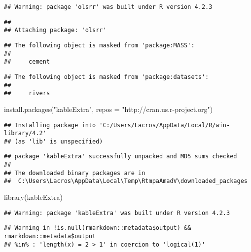 \documentclass[
]{article}
\newenvironment{Shaded}{\begin{snugshade}}{\end{snugshade}}
\newcommand{\AttributeTok}[1]{\textcolor[rgb]{0.77,0.63,0.00}{#1}}
\newcommand{\FunctionTok}[1]{\textcolor[rgb]{0.00,0.00,0.00}{#1}}
\newcommand{\NormalTok}[1]{#1}
\newcommand{\StringTok}[1]{\textcolor[rgb]{0.31,0.60,0.02}{#1}}
\begin{document}
\begin{verbatim}
## Warning: package 'olsrr' was built under R version 4.2.3
\end{verbatim}

\begin{verbatim}
## 
## Attaching package: 'olsrr'
\end{verbatim}

\begin{verbatim}
## The following object is masked from 'package:MASS':
## 
##     cement
\end{verbatim}

\begin{verbatim}
## The following object is masked from 'package:datasets':
## 
##     rivers
\end{verbatim}

\begin{Shaded}
\begin{Highlighting}[]
\FunctionTok{install.packages}\NormalTok{(}\StringTok{"kableExtra"}\NormalTok{, }\AttributeTok{repos =} \StringTok{"http://cran.us.r{-}project.org"}\NormalTok{)}
\end{Highlighting}
\end{Shaded}

\begin{verbatim}
## Installing package into 'C:/Users/Lacros/AppData/Local/R/win-library/4.2'
## (as 'lib' is unspecified)
\end{verbatim}

\begin{verbatim}
## package 'kableExtra' successfully unpacked and MD5 sums checked
## 
## The downloaded binary packages are in
##  C:\Users\Lacros\AppData\Local\Temp\RtmpaAmadV\downloaded_packages
\end{verbatim}

\begin{Shaded}
\begin{Highlighting}[]
\FunctionTok{library}\NormalTok{(kableExtra)}
\end{Highlighting}
\end{Shaded}

\begin{verbatim}
## Warning: package 'kableExtra' was built under R version 4.2.3
\end{verbatim}

\begin{verbatim}
## Warning in !is.null(rmarkdown::metadata$output) && rmarkdown::metadata$output
## %in% : 'length(x) = 2 > 1' in coercion to 'logical(1)'
\end{verbatim}
\end{document}
